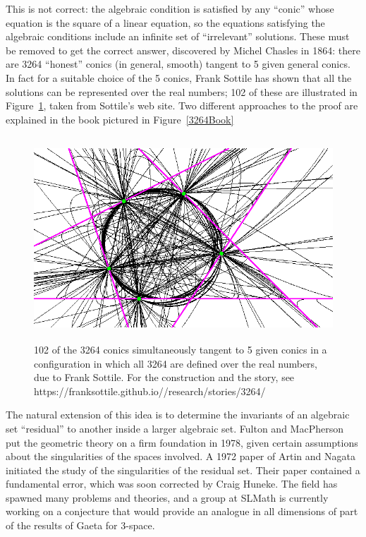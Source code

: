 \documentclass[11pt, oneside]{article}   	%
\begin{document}
This is not correct: the algebraic condition is satisfied by any ``conic''  whose equation is the square of a linear equation, so the equations satisfying the algebraic conditions include an infinite set of ``irrelevant'' solutions. These must be removed to get the correct answer, discovered by Michel Chasles in 1864: there are 3264 ``honest'' conics (in general, smooth) tangent to 5 given general conics. 
In fact for a suitable choice of the 5 conics, Frank Sottile has shown that all the solutions can be represented over the real numbers; 102 of these are illustrated in Figure~\ref{102Conics}, taken from Sottile's web site. Two different approaches to the proof are explained in the book pictured in 
Figure~\ref{3264Book}
\begin{figure}\label{102Conics}
\centerline {\includegraphics[height=3in]{102_conics.png}}
 \caption{102 of the 3264 conics simultaneously tangent to 5 given conics in 
 a configuration in which all 3264 are defined over the real numbers, due to 
 Frank Sottile. For the construction and the story, see 
 https://franksottile.github.io//research/stories/3264/}
\end{figure}



The natural extension of this idea is to determine the invariants of an algebraic set ``residual'' to another inside a larger algebraic set. Fulton and MacPherson put the geometric theory on a firm foundation in 1978, given certain assumptions about the singularities of the spaces involved. A 1972 paper of Artin and Nagata initiated the study of the singularities of the residual set. Their paper contained a fundamental error, which was soon corrected by Craig Huneke. The field has spawned many problems and theories, and a group at SLMath is currently working on a conjecture that would provide an analogue in all dimensions of part of the results of Gaeta for 3-space.
\end{document}
